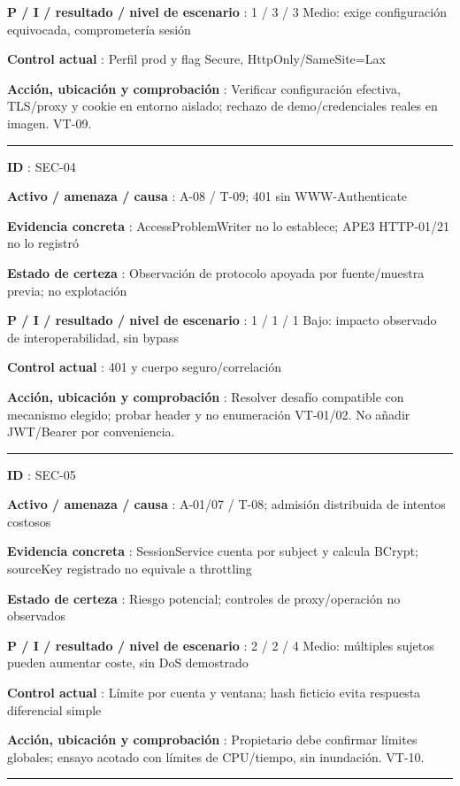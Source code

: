 \documentclass[12pt,a4paper]{report}
\begin{document}
\textbf{P / I / resultado / nivel de escenario }: 1 / 3 / 3 Medio: exige
configuración equivocada, comprometería sesión

\textbf{Control actual }: Perfil prod y flag Secure,
HttpOnly/SameSite=Lax

\textbf{Acción, ubicación y comprobación }: Verificar configuración
efectiva, TLS/proxy y cookie en entorno aislado; rechazo de
demo/credenciales reales en imagen. VT-09.

\medskip\hrule\medskip

\textbf{ID }: SEC-04

\textbf{Activo / amenaza / causa }: A-08 / T-09; 401 sin
WWW-Authenticate

\textbf{Evidencia concreta }: AccessProblemWriter no lo establece; APE3
HTTP-01/21 no lo registró

\textbf{Estado de certeza }: Observación de protocolo apoyada por
fuente/muestra previa; no explotación

\textbf{P / I / resultado / nivel de escenario }: 1 / 1 / 1 Bajo:
impacto observado de interoperabilidad, sin bypass

\textbf{Control actual }: 401 y cuerpo seguro/correlación

\textbf{Acción, ubicación y comprobación }: Resolver desafío compatible
con mecanismo elegido; probar header y no enumeración VT-01/02. No
añadir JWT/Bearer por conveniencia.

\medskip\hrule\medskip

\textbf{ID }: SEC-05

\textbf{Activo / amenaza / causa }: A-01/07 / T-08; admisión distribuida
de intentos costosos

\textbf{Evidencia concreta }: SessionService cuenta por subject y
calcula BCrypt; sourceKey registrado no equivale a throttling

\textbf{Estado de certeza }: Riesgo potencial; controles de
proxy/operación no observados

\textbf{P / I / resultado / nivel de escenario }: 2 / 2 / 4 Medio:
múltiples sujetos pueden aumentar coste, sin DoS demostrado

\textbf{Control actual }: Límite por cuenta y ventana; hash ficticio
evita respuesta diferencial simple

\textbf{Acción, ubicación y comprobación }: Propietario debe confirmar
límites globales; ensayo acotado con límites de CPU/tiempo, sin
inundación. VT-10.

\medskip\hrule\medskip
\end{document}
